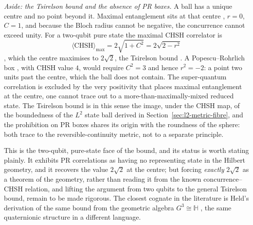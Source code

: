 
\medskip
\noindent\emph{Aside: the Tsirelson bound and the absence of PR boxes.}
A ball has a unique centre and no point beyond it. Maximal entanglement sits at
that centre \autocite{MosseriDandoloff2001}, $r=0$, $C=1$, and because the
Bloch radius cannot be negative, the concurrence cannot exceed unity. For a
two-qubit pure state the maximal CHSH correlator is
\begin{equation}
  \langle\mathrm{CHSH}\rangle_{\max}=2\sqrt{1+C^{2}}=2\sqrt{2-r^{2}}  
\end{equation}
\autocite{VerstraeteWolf2002},
which the centre maximises to $2\sqrt{2}$, the Tsirelson bound
\autocite{Cirelson1980QuantumInequality}. A Popescu--Rohrlich box \autocite{PopescuRohrlich1994},
with CHSH value $4$, would require $C^{2}=3$ and hence $r^{2}=-2$: a point two
units past the centre, which the ball does not contain. The super-quantum
correlation is excluded by the very positivity that places maximal entanglement
at the centre, one cannot trace out to a more-than-maximally-mixed reduced
state. The Tsirelson bound is in this sense the image, under the CHSH map, of the
boundedness of the $L^{2}$ state ball derived in
Section~\ref{sec:l2-metric-fibre}, and the prohibition on PR boxes shares its
origin with the roundness of the sphere: both trace to the reversible-continuity
metric, not to a separate principle.

\noindent This is the two-qubit, pure-state face of the bound, and its status is
worth stating plainly. It exhibits PR correlations as having no representing state
in the Hilbert geometry, and it recovers the value $2\sqrt{2}$ at the centre; but
forcing \emph{exactly} $2\sqrt{2}$ as a theorem of the geometry, rather than
reading it from the known concurrence--CHSH relation, and lifting the argument
from two qubits to the general Tsirelson bound, remain to be made rigorous. The
closest cognate in the literature is Held's derivation of the same bound from the
geometric algebra $G^{3}\cong\mathbb{H}$ \autocite{Held2021}, the same
quaternionic structure in a different language.

